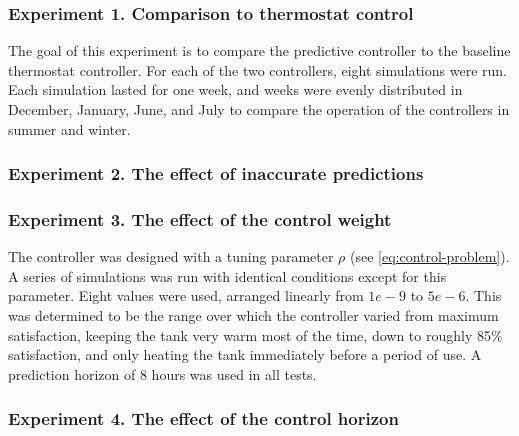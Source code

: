 \subsubsection{Experiment 1. Comparison to thermostat control}

The goal of this experiment is to compare the predictive controller to the baseline thermostat controller.
For each of the two controllers, eight simulations were run.
Each simulation lasted for one week, and weeks were evenly distributed in December, January, June, and July to compare the operation of the controllers in summer and winter.

\subsubsection{Experiment 2. The effect of inaccurate predictions}

\subsubsection{Experiment 3. The effect of the control weight}

The controller was designed with a tuning parameter $\rho$ (see \autoref{eq:control-problem}).
A series of simulations was run with identical conditions except for this parameter.
Eight values were used, arranged linearly from $1e-9$ to $5e-6$.
This was determined to be the range over which the controller varied from maximum satisfaction, keeping the tank very warm most of the time, down to roughly 85\% satisfaction, and only heating the tank immediately before a period of use.
A prediction horizon of 8 hours was used in all tests.

\subsubsection{Experiment 4. The effect of the control horizon}

